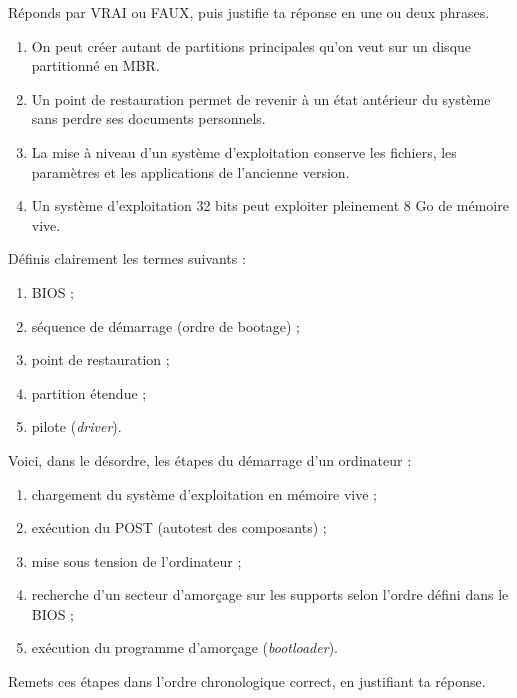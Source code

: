 \documentclass[11pt]{article}
\begin{document}
\begin{exercice}
Réponds par VRAI ou FAUX, puis justifie ta réponse en une ou deux phrases.
\begin{enumerate}
\item On peut créer autant de partitions principales qu'on veut sur un disque partitionné en MBR.
\item Un point de restauration permet de revenir à un état antérieur du système sans perdre ses documents personnels.
\item La mise à niveau d'un système d'exploitation conserve les fichiers, les paramètres et les applications de l'ancienne version.
\item Un système d'exploitation 32 bits peut exploiter pleinement 8 Go de mémoire vive.
\end{enumerate}
\end{exercice}

\begin{exercice}[Définitions]
Définis clairement les termes suivants :
\begin{enumerate}
\item BIOS ;
\item séquence de démarrage (ordre de bootage) ;
\item point de restauration ;
\item partition étendue ;
\item pilote (\emph{driver}).
\end{enumerate}
\end{exercice}

\begin{exercice}
Voici, dans le désordre, les étapes du démarrage d'un ordinateur :
\begin{enumerate}
\item[a.] chargement du système d'exploitation en mémoire vive ;
\item[b.] exécution du POST (autotest des composants) ;
\item[c.] mise sous tension de l'ordinateur ;
\item[d.] recherche d'un secteur d'amorçage sur les supports selon l'ordre défini dans le BIOS ;
\item[e.] exécution du programme d'amorçage (\emph{bootloader}).
\end{enumerate}
Remets ces étapes dans l'ordre chronologique correct, en justifiant ta réponse.
\end{exercice}
\end{document}
